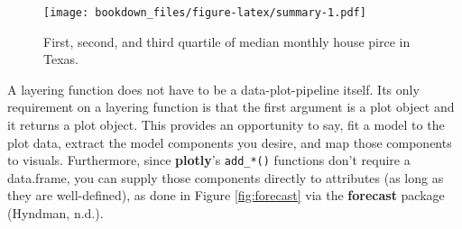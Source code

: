 \documentclass[12pt,]{isuthesis}
\begin{document}
\begin{figure}[htbp]
\centering
\texttt{[image: bookdown\_files/figure-latex/summary-1.pdf]}
\caption{\label{fig:summary}First, second, and third quartile of median
monthly house pirce in Texas.}
\end{figure}

A layering function does not have to be a data-plot-pipeline itself. Its
only requirement on a layering function is that the first argument is a
plot object and it returns a plot object. This provides an opportunity
to say, fit a model to the plot data, extract the model components you
desire, and map those components to visuals. Furthermore, since
\textbf{plotly}'s \texttt{add\_*()} functions don't require a
data.frame, you can supply those components directly to attributes (as
long as they are well-defined), as done in Figure \ref{fig:forecast} via
the \textbf{forecast} package (Hyndman, n.d.).
\end{document}
